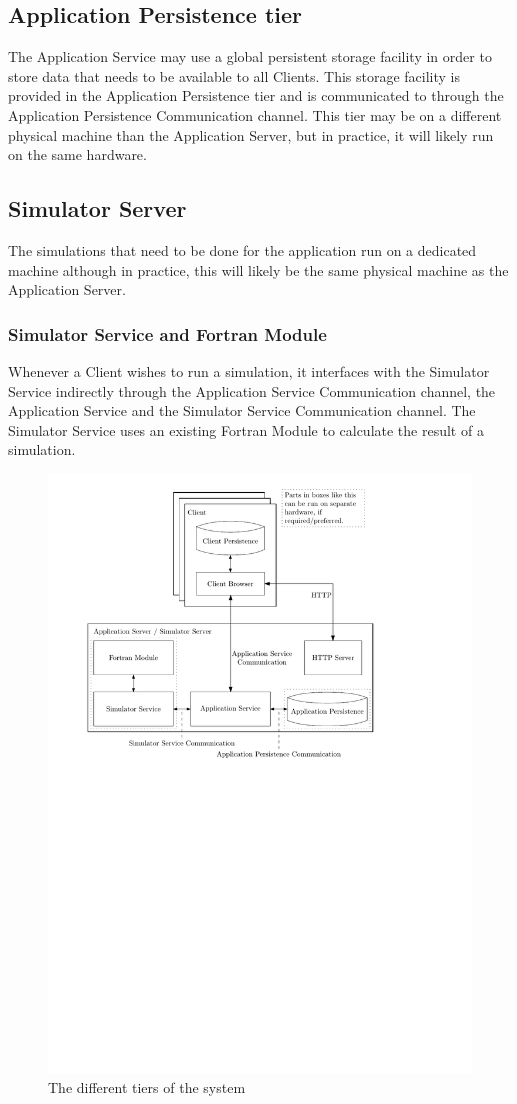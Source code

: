 \subsection{Application Persistence tier}
\label{sec:applicationpersistence}
The Application Service may use a global persistent storage facility in order to store data that needs to be available to all Clients. This storage facility is provided in the Application Persistence tier and is communicated to through the Application Persistence Communication channel. This tier may be on a different physical machine than the Application Server, but in practice, it will likely run on the same hardware.

\subsection{Simulator Server}
\label{sec:simulatorserver}
The simulations that need to be done for the application run on a dedicated machine although in practice, this will likely be the same physical machine as the Application Server.

\subsubsection{Simulator Service and Fortran Module}
\label{sec:simulatorservice}
Whenever a Client wishes to run a simulation, it interfaces with the Simulator Service indirectly through the Application Service Communication channel, the Application Service and the Simulator Service Communication channel. The Simulator Service uses an existing Fortran Module to calculate the result of a simulation.

\begin{figure}
	\centering
	\includegraphics{SoftwareTiers}
	\caption{The different tiers of the system}
	\label{fig:tierchannel}
\end{figure}
